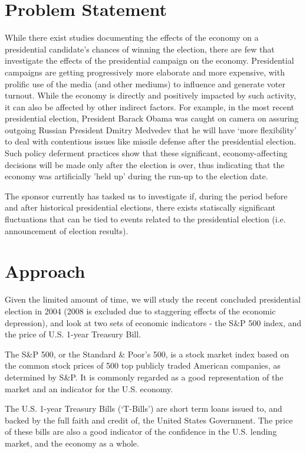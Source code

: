 \documentclass[12pt,letterpaper]{article}
\theoremstyle{definition}
\begin{document}
\section{Problem Statement}
While there exist studies documenting the effects of the economy on a presidential candidate's chances of winning the election, there are few that investigate the effects of the presidential campaign on the economy.  Presidential campaigns are getting progressively more elaborate and more expensive, with prolific use of the media (and other mediums) to influence and generate voter turnout. While the economy is directly and positively impacted  by such activity, it can also be affected by other indirect factors. For example, in the most recent presidential election, President Barack Obama was caught on camera on assuring outgoing Russian President Dmitry Medvedev that he will have `more flexibility' to deal with contentious issues like missile defense after the presidential election. Such policy deferment practices show that these significant, economy-affecting decisions will be made only after the election is over, thus indicating that the economy was artificially 'held up' during the run-up to the election date.

The sponsor currently has tasked us to investigate if, during the period before and after historical presidential elections, there exists statiscally significant fluctuations that can be tied to events related to the presidential election (i.e. announcement of election results).

\section{Approach}
Given the limited amount of time, we will study the recent concluded presidential election in 2004 (2008 is excluded due to staggering effects of the economic depression), and look at two sets of economic indicators - the  S\&P 500 index, and the price of U.S. 1-year Treasury Bill. 

The S\&P 500, or the Standard \& Poor's 500, is a stock market index based on the common stock prices of 500 top publicly traded American companies, as determined by S\&P. It is commonly regarded as a good representation of the market and an indicator for the U.S. economy. 

The U.S. 1-year Treasury Bills (`T-Bills') are short term loans issued to, and backed by the full faith and credit of, the United States Government. The price of these bills are also a good indicator of the confidence in the U.S. lending market, and the economy as a whole.
\end{document}
